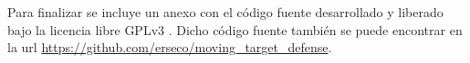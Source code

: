 \bigskip
Para finalizar se incluye un anexo con el código fuente desarrollado y liberado bajo la licencia libre GPLv3 \cite{free_software_foundation_gnu_2007}. Dicho código fuente también se puede encontrar en la url \url{https://github.com/erseco/moving_target_defense}.











